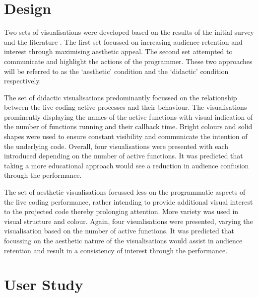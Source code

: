 \documentclass{sig-alternate}
\begin{document}
\section{Design}

Two sets of visualisations were developed based on the results of the initial survey and the literature . The first set focussed on increasing audience retention and interest through maximising aesthetic appeal. The second set attempted to communicate and highlight the actions of the programmer. These two approaches will be referred to as the `aesthetic' condition and the `didactic' condition respectively.





The set of didactic visualisations predominantly focussed on the relationship between the live coding active processes and their behaviour. The visualisations prominently displaying the names of the active functions with visual indication of the number of functions running and their callback time. Bright colours and solid shapes were used to ensure constant visibility and communicate the intention of the underlying code. Overall, four visualisations were presented with each introduced depending on the number of active functions. It was predicted that taking a more educational approach would see a reduction in audience confusion through the performance.

The set of aesthetic visualisations focussed less on the programmatic aspects of the live coding performance, rather intending to provide additional visual interest to the projected code thereby prolonging attention. More variety was used in visual structure and colour. Again, four visualisations were presented, varying the visualisation based on the number of active functions. It was predicted that focussing on the aesthetic nature of the visualisations would assist in audience retention and result in a consistency of interest through the performance.

\section{User Study}

\end{document}
